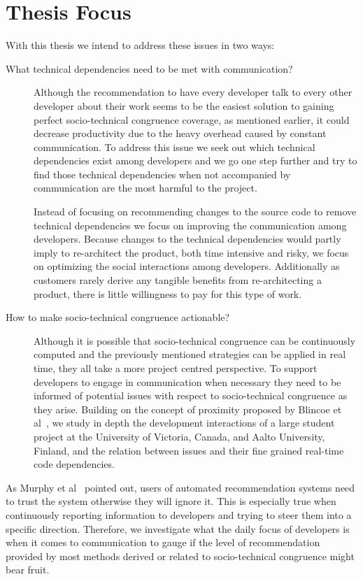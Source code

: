 \section{Thesis Focus}
With this thesis we intend to address these issues in two ways:
\begin{description}
\item[What technical dependencies need to be met with communication?] 
Although the recommendation to have every developer talk to every other developer about their work seems to be the easiest solution to gaining perfect socio-technical congruence coverage, as mentioned earlier, it could decrease productivity due to the heavy overhead caused by  constant communication.
To address this issue we seek out which technical dependencies exist among developers and we go one step further and try to find those technical dependencies when not accompanied by communication are the most harmful to the project.

Instead of focusing on recommending changes to the source code to remove technical dependencies we focus on improving the communication among developers.
Because changes to the technical dependencies would partly imply to re-architect the product, both time intensive and risky, we focus on optimizing the social interactions among developers.
Additionally as customers rarely derive any tangible benefits from re-architecting a product, there is little willingness to pay for this type of work.

\item[How to make socio-technical congruence actionable?] Although it is possible that socio-technical congruence can be continuously computed and the previously mentioned strategies can be applied in real time, they all take a more project centred perspective.
To support developers to engage in communication when necessary they need to be informed of potential issues with respect to socio-technical congruence as they arise.
Building on the concept of proximity proposed by Blincoe et al~\cite{blincoe:cscw:2012}, we study in depth the development interactions of a large student project at the University of Victoria, Canada, and Aalto University, Finland, and the relation between issues and their fine grained real-time code dependencies.
\end{description}

As Murphy et al~\cite{murphy:rsse:2010} pointed out, users of automated recommendation systems need to trust the system otherwise they will ignore it.
This is especially true when continuously reporting information to developers and trying to steer them into a specific direction.
Therefore, we investigate what the daily focus of developers is when it comes to communication to gauge if the level of recommendation provided by most methods derived or related to socio-technical congruence might bear fruit.
